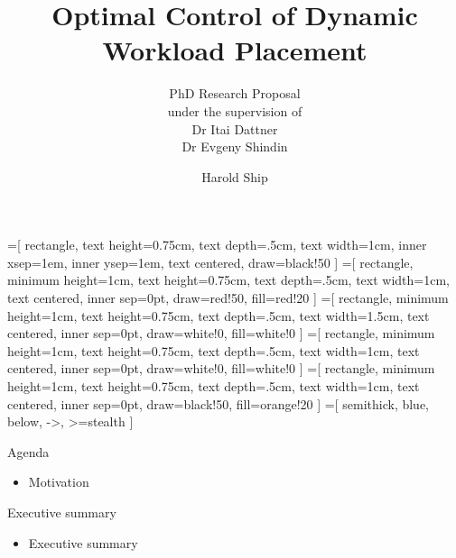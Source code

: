 \documentclass[pdf]{beamer}
\title{Optimal Control of Dynamic Workload Placement}
\subtitle{PhD Research Proposal \\ under the supervision of \\ Dr Itai Dattner \\ Dr Evgeny Shindin}
\author{Harold Ship}
\institute{University of Haifa}
\theoremstyle{definition}
\begin{document}
=[%
rectangle,
text height=0.75cm,
text depth=.5cm,
text width=1cm,
inner xsep=1em,
inner ysep=1em,
text centered,
draw=black!50
]
=[%
rectangle,
minimum height=1cm,
text height=0.75cm,
text depth=.5cm,
text width=1cm,
text centered,
inner sep=0pt,
draw=red!50,
fill=red!20
]
=[%
rectangle,
minimum height=1cm,
text height=0.75cm,
text depth=.5cm,
text width=1.5cm,
text centered,
inner sep=0pt,
draw=white!0,
fill=white!0
]
=[%
rectangle,
minimum height=1cm,
text height=0.75cm,
text depth=.5cm,
text width=1cm,
text centered,
inner sep=0pt,
draw=white!0,
fill=white!0
]
=[%
rectangle,
minimum height=1cm,
text height=0.75cm,
text depth=.5cm,
text width=1cm,
text centered,
inner sep=0pt,
draw=black!50,
fill=orange!20
]
=[%
semithick,
blue,
below,
->,
>=stealth
]



\begin{frame}
    \titlepage
\end{frame}

\begin{frame}{Agenda}
    \begin{itemize}
        \item Motivation
    \end{itemize}
\end{frame}

\begin{frame}{Executive summary}
    \begin{itemize}
        \item Executive summary
    \end{itemize}
\end{frame}

\end{document}
